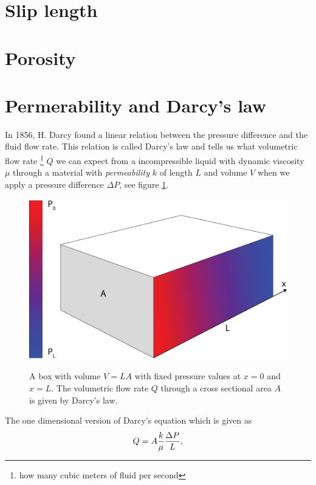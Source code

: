 \section{Slip length}
\label{sec:slip_length}
\section{Porosity}

\section{Permerability and Darcy's law}
\label{sec:darcy_law}
In 1856, H. Darcy found a linear relation between the pressure difference and the fluid flow rate. This relation is called Darcy's law and tells us what volumetric flow rate \footnote{how many cubic meters of fluid per second} $Q$ we can expect from a incompressible liquid with dynamic viscosity $\mu$ through a material with \textit{permeability} $k$ of length $L$ and volume $V$ when we apply a pressure difference $\Delta P$, see figure \ref{fig:darcys_law}. 
\begin{figure}[h]
\begin{center}
\includegraphics[width=\textwidth, trim=0cm 0cm 0cm 0cm, clip]{kinetic_theory/figures/darcy.eps}
\label{fig:darcys_law}
\end{center}
\caption{A box with volume $V=LA$ with fixed pressure values at $x=0$ and $x=L$. The volumetric flow rate $Q$ through a cross sectional area $A$ is given by Darcy's law.}
\end{figure}
The one dimensional version of Darcy's equation which is given as
\begin{align}
\label{eq:darcy_1}
	Q = A{k\over \mu}{\Delta P\over L},
\end{align}
